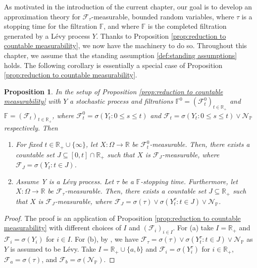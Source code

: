 \documentclass[11pt,a4paper,twoside,openany]{report}
\numberwithin{equation}{section}
\theoremstyle{plain} %
\newtheorem{proposition}[theorem]{Proposition}
\theoremstyle{definition} %
\theoremstyle{remark} %
\let\parencite\authnumparencite
\begin{document}
As motivated in the introduction of the current chapter, our goal is to develop an approximation theory for \(\mathcal{F_{\tau}}\)-measurable, bounded random variables, where \(\tau\) is a stopping time for the filtration \(\mathbb{F}\), and where \(\mathbb{F}\) is the completed filtration generated by a Lévy process \(Y\).
Thanks to Proposition \ref{prop:reduction to countable measurability}, we now have the machinery to do so. Throughout this chapter, we assume that the standing assumption \ref{def:standing assumptions} holds. The following corollary is essentially a special case of Proposition \ref{prop:reduction to countable measurability}. 
\begin{proposition}\label{prop:reduction to countable measurability with filtration}
    In the setup of Proposition \ref{prop:reduction to countable measurability} with \(Y\) a stochastic process and filtrations \(\mathbb{F}^0=(\mathcal{F}^0_t)_{t\in\mathbb{R}_+}\) and \(\mathbb{F}=(\mathcal{F}_t)_{t\in\mathbb{R}_+}\), where \(\mathcal{F}^0_t=\sigma(Y_t:0\leq s\leq t)\) and \(\mathcal{F}_t=\sigma(Y_t:0\leq s\leq t)\vee\mathcal{N}_{\mathbb{P}}\) respectively. Then
    \begin{enumerate}[label=(\alph*)]
        \item For fixed \(t\in\mathbb{R}_+\cup\{\infty\}\), let \(X:\Omega\to\mathbb{R}\) be \(\mathcal{F}^0_t\)-measurable. Then, there exists a \textit{countable} set \(J\subseteq [0,t]\cap\mathbb{R}_+\) such that \(X\) is \(\mathcal{F}_J\)-measurable, where \(\mathcal{F}_J = \sigma(Y_t:t\in J)\). 
        \item Assume Y is a Lévy process. Let \(\tau\) be a \(\mathbb{F}\)-stopping time. Furthermore, let \(X:\Omega\to\mathbb{R}\) be \(\mathcal{F}_{\tau}\)-measurable. Then, there exists a countable set \(J\subseteq\mathbb{R}_+\) such that \(X\) is \(\mathcal{F}_J\)-measurable, where \(\mathcal{F}_J=\sigma(\tau)\vee\sigma(Y_t^{\tau}:t\in J)\vee \mathcal{N}_{\mathbb{P}}\).
    \end{enumerate}
\end{proposition}
\begin{proof}
    The proof is an application of Proposition \ref{prop:reduction to countable measurability} with different choices of \(I\) and \((\mathcal{F}_i)_{i\in I}\). For (a) take \(I=\mathbb{R}_+\) and \(\mathcal{F}_i=\sigma(Y_i)\) for \(i\in I\). For (b), by \parencite[Thm.~13.45]{HeWangYan1992}, we have \(\mathcal{F}_{\tau}=\sigma(\tau)\vee\sigma(Y_t^{\tau}:t\in J)\vee \mathcal{N}_{\mathbb{P}}\) as \(Y\) is assumed to be Lévy. Take \(I=\mathbb{R}_+\cup\{a,b\}\) and \(\mathcal{F}_i=\sigma(Y_i^{\tau})\) for \(i\in \mathbb{R}_+\), \(\mathcal{F}_a=\sigma(\tau)\), and \(\mathcal{F}_b=\sigma(\mathcal{N}_{\mathbb{P}})\). 
\end{proof}
\end{document}
